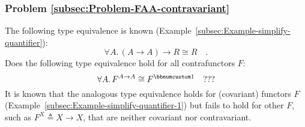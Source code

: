 \subsubsection{Problem \label{subsec:Problem-FAA-contravariant}\ref{subsec:Problem-FAA-contravariant}}

The following type equivalence is known (Example~\ref{subsec:Example-simplify-quantifier}):
\[
\forall A.\,(A\rightarrow A)\rightarrow R\cong R\quad.
\]
Does the following type equivalence hold for all contrafunctors $F$:
\[
\forall A.\,F^{A\rightarrow A}\cong F^{\bbnum 1}\quad???
\]
It is known that the analogous type equivalence holds for (covariant)
functors $F$ (Example~\ref{subsec:Example-simplify-quantifier-1})
but fails to hold for other $F$, such as $F^{X}\triangleq X\rightarrow X$,
that are neither covariant nor contravariant.

